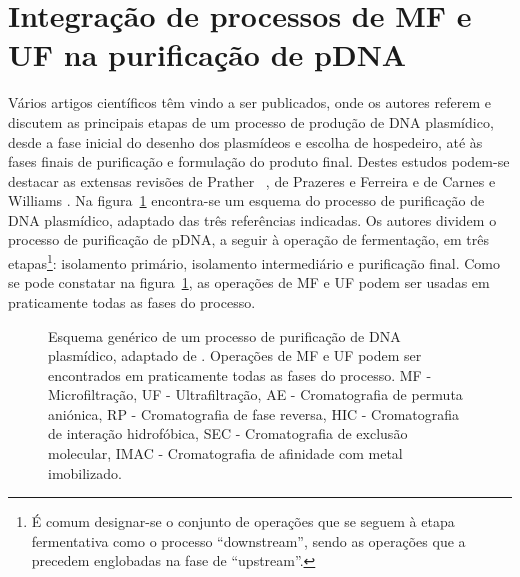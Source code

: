 \section{Integração de processos de MF e UF na purificação de pDNA}
Vários artigos científicos têm vindo a ser publicados, onde os autores referem e discutem as principais etapas de um processo de produção de DNA plasmídico, desde a fase inicial do desenho dos plasmídeos e escolha de hospedeiro, até às fases finais de purificação e formulação do produto final. Destes estudos podem-se destacar as extensas revisões de Prather \et\ \cite{prather}, de Prazeres e Ferreira \cite{flowsheets} e de Carnes e Williams \cite{carnes}. Na figura~\ref{fig:flowsheets} encontra-se um esquema do processo de purificação de DNA plasmídico, adaptado das três referências indicadas. Os autores dividem o processo de purificação de pDNA, a seguir à operação de fermentação, em três etapas\footnote{É comum designar-se o conjunto de operações que se seguem à etapa fermentativa como o processo ``downstream'', sendo as operações que a precedem englobadas na fase de ``upstream''.}: isolamento primário, isolamento intermediário e purificação final. Como se pode constatar na figura~\ref{fig:flowsheets}, as operações de MF e UF podem ser usadas em praticamente todas as fases do processo.
\begin{figure}[!t]
\centering

\caption[Esquema genérico de um processo de purificação de DNA plasmídico.]{Esquema genérico de um processo de purificação de DNA plasmídico, adaptado de \cite{prather,flowsheets,carnes}. Operações de MF e UF podem ser encontrados em praticamente todas as fases do processo. MF - Microfiltração, UF - Ultrafiltração, AE - Cromatografia de permuta aniónica, RP - Cromatografia de fase reversa, HIC - Cromatografia de interação hidrofóbica, SEC - Cromatografia de exclusão molecular, IMAC - Cromatografia de afinidade com metal imobilizado.}
\label{fig:flowsheets}
\end{figure}   

